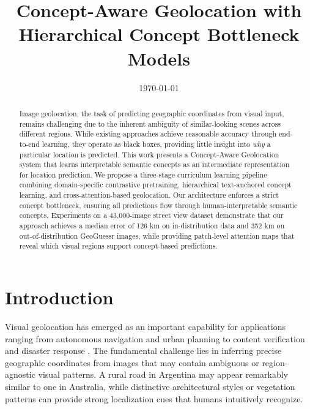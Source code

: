 \documentclass{uva-inf-article}
\title{Concept-Aware Geolocation with Hierarchical Concept Bottleneck Models}
\date{\today}
\begin{document}
\maketitle

\tableofcontents
\begin{abstract}
Image geolocation, the task of predicting geographic coordinates from visual input, remains challenging due to the inherent ambiguity of similar-looking scenes across different regions. While existing approaches achieve reasonable accuracy through end-to-end learning, they operate as black boxes, providing little insight into \textit{why} a particular location is predicted. This work presents a Concept-Aware Geolocation system that learns interpretable semantic concepts as an intermediate representation for location prediction. We propose a three-stage curriculum learning pipeline combining domain-specific contrastive pretraining, hierarchical text-anchored concept learning, and cross-attention-based geolocation. Our architecture enforces a strict concept bottleneck, ensuring all predictions flow through human-interpretable semantic concepts. Experiments on a 43,000-image street view dataset demonstrate that our approach achieves a median error of 126 km on in-distribution data and 352 km on out-of-distribution GeoGuessr images, while providing patch-level attention maps that reveal which visual regions support concept-based predictions.
\end{abstract}


\section{Introduction}
\label{sec:introduction}

Visual geolocation has emerged as an important capability for applications ranging from autonomous navigation and urban planning to content verification and disaster response \parencite{hays2008im2gps}. The fundamental challenge lies in inferring precise geographic coordinates from images that may contain ambiguous or region-agnostic visual patterns. A rural road in Argentina may appear remarkably similar to one in Australia, while distinctive architectural styles or vegetation patterns can provide strong localization cues that humans intuitively recognize.
\end{document}
